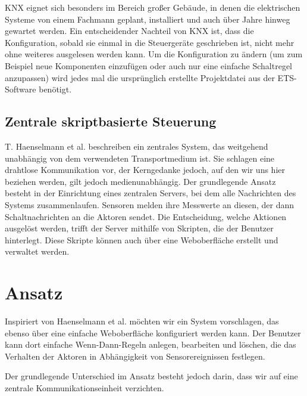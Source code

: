 \documentclass{IEEEtran}
\begin{document}
    KNX eignet sich besonders im Bereich großer Gebäude, in denen die
    elektrischen Systeme von einem Fachmann geplant, installiert und auch über
    Jahre hinweg gewartet werden. Ein entscheidender Nachteil von KNX ist,
    dass die Konfiguration, sobald sie einmal in die Steuergeräte geschrieben
    ist, nicht mehr ohne weiteres ausgelesen werden kann.
    Um die Konfiguration zu ändern (um zum Beispiel neue Komponenten einzufügen
    oder auch nur eine einfache Schaltregel anzupassen) wird jedes mal
    die ursprünglich erstellte Projektdatei aus der ETS-Software benötigt.

    \subsection{Zentrale skriptbasierte Steuerung}
        T. Haenselmann et al. \cite{haenselmann2007skriptbasierte}
        beschreiben ein zentrales System, das weitgehend
        unabhängig von dem verwendeten Transportmedium ist.
        Sie schlagen eine drahtlose Kommunikation vor,
        der Kerngedanke jedoch, auf den wir uns hier beziehen werden,
        gilt jedoch medienunabhängig.
        Der grundlegende Ansatz besteht in der Einrichtung eines zentralen
        Servers, bei dem alle Nachrichten des Systems zusammenlaufen.
        Sensoren melden ihre Messwerte an diesen, der dann Schaltnachrichten
        an die Aktoren sendet.
        Die Entscheidung, welche Aktionen ausgelöst werden, trifft der Server
        mithilfe von Skripten, die der Benutzer hinterlegt.
        Diese Skripte können auch über eine Weboberfläche erstellt und
        verwaltet werden.


\section{Ansatz}
    Inspiriert von Haenselmann et al. \cite{haenselmann2007skriptbasierte}
    möchten wir ein System vorschlagen,
    das ebenso über eine einfache Weboberfläche konfiguriert werden kann.
    Der Benutzer kann dort einfache Wenn-Dann-Regeln anlegen, bearbeiten und
    löschen, die das Verhalten der Aktoren in Abhängigkeit von Sensorereignissen
    festlegen.

    Der grundlegende Unterschied im Ansatz besteht jedoch darin,
    dass wir auf eine zentrale Kommunikationseinheit verzichten.
\end{document}
